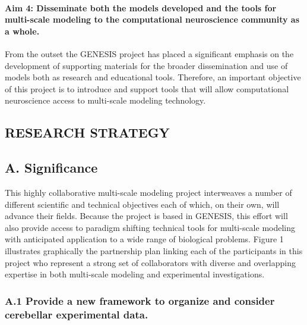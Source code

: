 \documentclass[12pt]{article}
\begin{document}
\paragraph{Aim 4: Disseminate both the models developed and the tools for multi-scale modeling to the computational neuroscience community as a whole.} From the outset the GENESIS project has placed a significant emphasis on the development of supporting materials for the broader dissemination and use of models both as research and educational tools. Therefore, an important objective of this project is to introduce and support tools that will allow computational neuroscience access to multi-scale modeling technology.\\

\subsection*{RESEARCH STRATEGY}

\subsection*{A. Significance}

\noindent This highly collaborative multi-scale modeling project interweaves a number of different scientific and technical objectives each of which, on their own, will advance their fields. Because the project is based in GENESIS, this effort will also provide access to paradigm shifting technical tools for multi-scale modeling with anticipated application to a wide range of biological problems. Figure 1 illustrates graphically the partnership plan linking each of the participants in this project who represent a strong set of collaborators with diverse and overlapping expertise in both multi-scale modeling and experimental investigations.\\

\subsubsection*{A.1 Provide a new framework to organize and consider cerebellar experimental data.}
\end{document}
